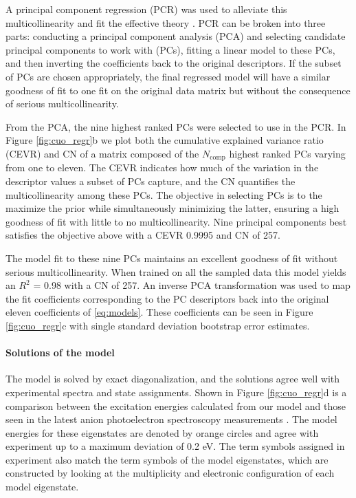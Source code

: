 \documentclass[12pt]{article}
\begin{document}
A principal component regression (PCR) was used to alleviate this multicollinearity and fit the effective theory \cite{10.2307/2348005}.
PCR can be broken into three parts: conducting a principal component analysis (PCA) and selecting candidate principal components to work with (PCs), fitting a linear model to these PCs, and then inverting the coefficients back to the original descriptors.
If the subset of PCs are chosen appropriately, the final regressed model will have a similar goodness of fit to one fit on the original data matrix but without the consequence of serious multicollinearity.

From the PCA, the nine highest ranked PCs were selected to use in the PCR.
In Figure \eqref{fig:cuo_regr}b we plot both the cumulative explained variance ratio (CEVR) and CN of a matrix composed of the $N_\text{comp}$ highest ranked PCs varying from one to eleven.
The CEVR indicates how much of the variation in the descriptor values a subset of PCs capture, and the CN quantifies the multicollinearity among these PCs.
The objective in selecting PCs is to the maximize the prior while simultaneously minimizing the latter, ensuring a high goodness of fit with little to no multicollinearity.
Nine principal components best satisfies the objective above with a CEVR 0.9995 and CN of 257.

The model fit to these nine PCs maintains an excellent goodness of fit without serious multicollinearity.
When trained on all the sampled data this model yields an $R^2$ = 0.98 with a CN of 257. 
An inverse PCA transformation was used to map the fit coefficients corresponding to the PC descriptors back into the original eleven coefficients of \eqref{eq:models}.
These coefficients can be seen in Figure \ref{fig:cuo_regr}c with single standard deviation bootstrap error estimates.

\paragraph{Solutions of the model}
The model is solved by exact diagonalization, and the solutions agree well with experimental spectra and state assignments.
Shown in Figure \ref{fig:cuo_regr}d is a comparison between the excitation energies calculated from our model and those seen in the latest anion photoelectron spectroscopy measurements \cite{Wu1997}.
The model energies for these eigenstates are denoted by orange circles and agree with experiment up to a maximum deviation of 0.2 eV.
The term symbols assigned in experiment also match the term symbols of the model eigenstates, which are constructed by looking at the multiplicity and electronic configuration of each model eigenstate. 
\end{document}

